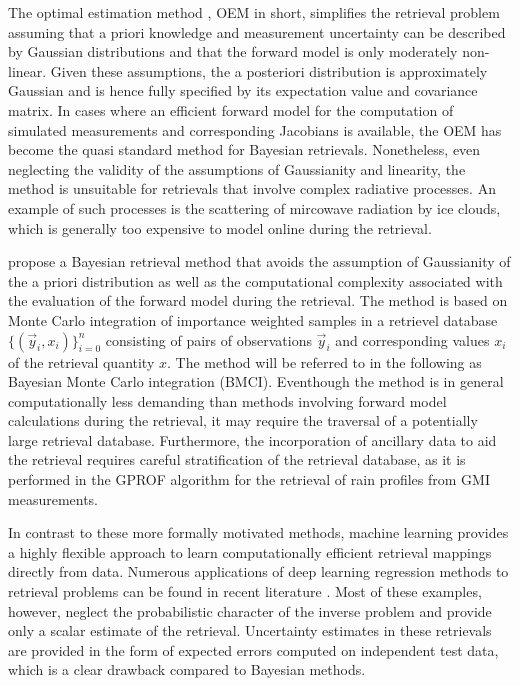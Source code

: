 \documentclass[journal abbreviation, manuscript]{copernicus}
\begin{document}
The optimal estimation method \citep{rodgers}, OEM in short,
simplifies the retrieval problem assuming that a priori knowledge and
measurement uncertainty can be described by Gaussian distributions and that the
forward model is only moderately non-linear. Given these assumptions, the a
posteriori distribution is approximately Gaussian and is hence fully specified
by its expectation value and covariance matrix. In cases where an efficient
forward model for the computation of simulated measurements and corresponding
Jacobians is available, the OEM has become the quasi standard method for Bayesian
retrievals. Nonetheless, even neglecting the validity of the assumptions of
Gaussianity and linearity, the method is unsuitable for retrievals that involve
complex radiative processes. An example of such processes is the scattering
of mircowave radiation by ice clouds, which is generally too expensive to model
online during the retrieval.

\cite{kummerow_1} propose a Bayesian retrieval method that avoids the assumption
of Gaussianity of the a priori distribution as well as the computational
complexity associated with the evaluation of the forward model during the
retrieval. The method is based on Monte Carlo integration of importance weighted
samples in a retrievel database $\{(\vec{y}_i, x_i)\}_{i = 0}^n$ consisting of
pairs of observations $\vec{y}_i$ and corresponding values $x_i$ of the
retrieval quantity $x$. The method will be referred to in the following as
Bayesian Monte Carlo integration (BMCI). Eventhough the method is in general
computationally less demanding than methods involving forward model calculations
during the retrieval, it may require the traversal of a potentially large
retrieval database. Furthermore, the incorporation of ancillary data to aid the
retrieval requires careful stratification of the retrieval database, as it is
performed in the GPROF \citep{gprof} algorithm for the retrieval of rain
profiles from GMI measurements.

In contrast to these more formally motivated methods, machine learning provides a
highly flexible approach to learn computationally efficient retrieval mappings
directly from data. Numerous applications of deep learning regression methods
to retrieval problems can be found in recent literature \citep{holl, strandgren, hakansson}.
Most of these examples, however, neglect the probabilistic character of the inverse problem
and provide only a scalar estimate of the retrieval. Uncertainty estimates in these
retrievals are provided in the form of expected errors computed on independent test data,
which is a clear drawback compared to Bayesian methods.
\end{document}
